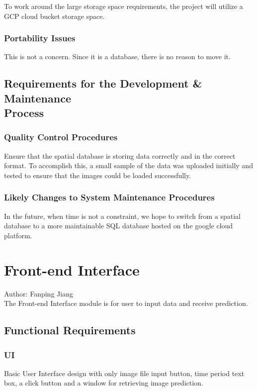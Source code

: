 \documentclass[12pt]{article}
\begin{document}
To work around the large storage space requirements, the project will utilize a GCP cloud bucket
storage space.

\subsubsection {Portability Issues}

This is not a concern. Since it is a database, there is no reason to move it.

\subsection{Requirements for the Development \& Maintenance\\  Process}

\subsubsection {Quality Control Procedures}

Ensure that the spatial database is storing data correctly and in the correct format. To accomplish this, a small
sample of the data was uploaded initially and tested
to ensure that the images could be loaded successfully. 

\subsubsection {Likely Changes to System Maintenance Procedures}

In the future, when time is not a constraint, we hope to 
switch from a spatial database to a more maintainable SQL database hosted on the google cloud platform.

\section{Front-end Interface}
Author: Fanping Jiang\\

\noindent The Front-end Interface module is for user to input data and receive prediction.

\subsection{Functional Requirements}
\subsubsection{UI}
Basic User Interface design with only image file input button, time period text box, a click button and a window for retrieving image prediction.
\end{document}
